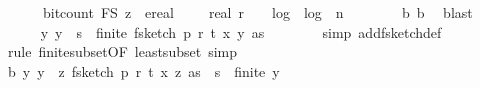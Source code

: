 \begin{isabellebody}
\ \ \ \ \ \ bit{\isacharunderscore}{\kern0pt}count\ {\isacharparenleft}{\kern0pt}F\isactrlsub S\ z{\isacharparenright}{\kern0pt}\ {\isasymle}\ ereal\ {\isacharparenleft}{\kern0pt}{}{}\ {\isacharplus}{\kern0pt}\ {}\ {\isacharasterisk}{\kern0pt}\ real\ r\ {\isacharplus}{\kern0pt}\ {}\ {\isacharasterisk}{\kern0pt}\ log\ {}\ {\isacharparenleft}{\kern0pt}log\ {}\ {\isacharparenleft}{\kern0pt}n{\isacharplus}{\kern0pt}{}{\isacharparenright}{\kern0pt}{\isacharparenright}{\kern0pt}{\isacharparenright}{\kern0pt}{\isachardoublequoteclose}\isanewline
\ \ \ \ \ \ \isamarkupfalse%
\ b{\isacharunderscore}{\kern0pt}{}{\isacharunderscore}{\kern0pt}{}{}\ b{\isacharunderscore}{\kern0pt}{}\ \isamarkupfalse%
\ blast\isanewline
\isanewline
\ \ \ \ \isamarkupfalse%
\ {\isachardoublequoteopen}{\isasymAnd}y{\isachardot}{\kern0pt}\ y\ {\isasymin}\ {\isacharbraceleft}{\kern0pt}{}{\isachardot}{\kern0pt}{\isachardot}{\kern0pt}{\isacharless}{\kern0pt}s{\isacharbraceright}{\kern0pt}\ {\isasymLongrightarrow}\ finite\ {\isacharparenleft}{\kern0pt}f{}{\isacharunderscore}{\kern0pt}sketch\ p\ r\ t\ {\isacharparenleft}{\kern0pt}x\ y{\isacharparenright}{\kern0pt}\ as{\isacharparenright}{\kern0pt}{\isachardoublequoteclose}\isanewline
\ \ \ \ \ \ \isamarkupfalse%
\ {\isacharparenleft}{\kern0pt}simp\ add{\isacharcolon}{\kern0pt}f{}{\isacharunderscore}{\kern0pt}sketch{\isacharunderscore}{\kern0pt}def{\isacharparenright}{\kern0pt}\isanewline
\ \ \ \ \ \ \isamarkupfalse%
\ {\isacharparenleft}{\kern0pt}rule\ finite{\isacharunderscore}{\kern0pt}subset{\isacharbrackleft}{\kern0pt}OF\ least{\isacharunderscore}{\kern0pt}subset{\isacharbrackright}{\kern0pt}{\isacharcomma}{\kern0pt}\ simp{\isacharparenright}{\kern0pt}\isanewline
\ \ \ \ \isamarkupfalse%
\ b{\isacharunderscore}{\kern0pt}{}{\isacharcolon}{\kern0pt}\ {\isachardoublequoteopen}{\isasymAnd}y{\isachardot}{\kern0pt}\ y\ {\isasymin}\ {\isacharparenleft}{\kern0pt}{\isasymlambda}z{\isachardot}{\kern0pt}\ f{}{\isacharunderscore}{\kern0pt}sketch\ p\ r\ t\ {\isacharparenleft}{\kern0pt}x\ z{\isacharparenright}{\kern0pt}\ as{\isacharparenright}{\kern0pt}\ {\isacharbackquote}{\kern0pt}\ {\isacharbraceleft}{\kern0pt}{}{\isachardot}{\kern0pt}{\isachardot}{\kern0pt}{\isacharless}{\kern0pt}s{\isacharbraceright}{\kern0pt}\ {\isasymLongrightarrow}\ finite\ y{\isachardoublequoteclose}\ \isamarkupfalse%

\end{isabellebody}
